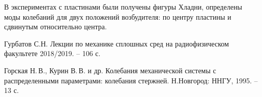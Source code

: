 В экспериментах с пластинами были получены фигуры Хладни, определены моды колебаний для двух положений возбудителя: по центру пластины и сдвинутым относительно центра.

\begin{thebibliography}{}
   Гурбатов С.Н. Лекции по механике сплошных сред на радиофизическом факультете 2018/2019. -- 106 с.
  
   Горская Н.\,В., Курин В.\,В. и др. Колебания механической системы с распределенными параметрами: колебания стержней. Н.Новгород: ННГУ, 1995. -- 13 с.
  
\end{thebibliography}


